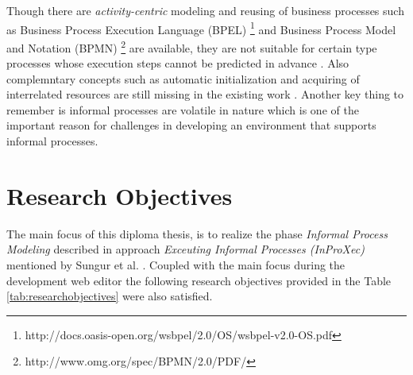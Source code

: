 Though there are \textit{activity-centric} modeling and reusing of business processes such as Business Process Execution Language (BPEL) \footnote{http://docs.oasis-open.org/wsbpel/2.0/OS/wsbpel-v2.0-OS.pdf} and Business Process Model and Notation (BPMN) \footnote{http://www.omg.org/spec/BPMN/2.0/PDF/} are available, they are not suitable for certain type processes whose execution steps cannot be predicted in advance \cite{Sungur2014a}. Also complemntary concepts such as automatic initialization and acquiring of interrelated resources are still missing in the existing work \cite{Sungur2015}. Another key thing to remember is informal processes are volatile in nature which is one of the important reason for challenges in developing an environment that supports informal processes.

\section {Research Objectives}
\label{sec:researchobjectives}
The main focus of this diploma thesis, is to realize the phase \textit{Informal Process Modeling} described in approach \textit{Exceuting Informal Processes (InProXec)} mentioned by Sungur et al. \cite{Sungur2015}. Coupled with the main focus during the development web editor the following research objectives provided in the Table \ref{tab:researchobjectives} were also satisfied. 

